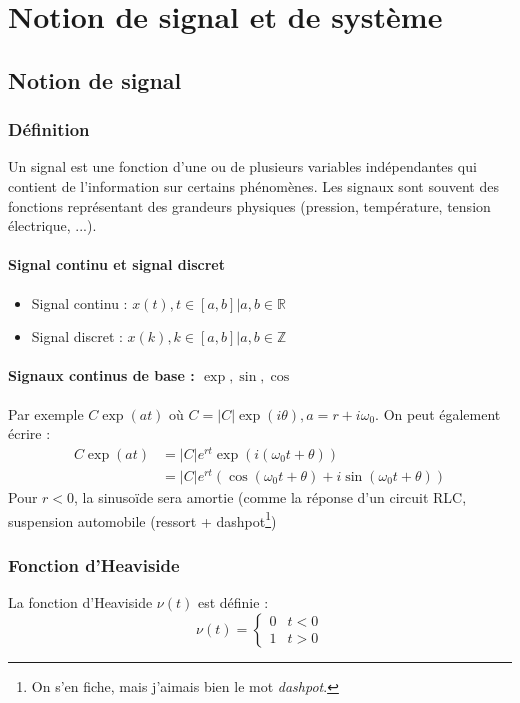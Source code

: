 \chapter{Notion de signal et de système}
\section{Notion de signal}
\subsection{Définition}
Un signal est une fonction d’une ou de plusieurs variables indépendantes 
qui contient de l’information sur certains phénomènes. Les signaux sont 
souvent des fonctions représentant des grandeurs physiques (pression, 
température, tension électrique, ...).
	
\subsubsection{Signal continu et signal discret}
\begin{itemize}
	\item Signal continu : $x(t), t \in [a,b] | a,b\in\mathbb{R}$
	\item Signal discret : $x(k), k \in [a,b] | a,b\in\mathbb{Z}$
\end{itemize}
	
\subsubsection{Signaux continus de base : $\exp,\sin,\cos$}
Par exemple $C\exp(at)$ où $C = |C|\exp(i\theta), a = r+i\omega_0$. 
On peut également écrire :
\begin{equation}
	\begin{array}{ll}
		C\exp(at) & = |C|e^{rt}\exp(i(\omega_0t+\theta))                          \\
		          & = |C|e^{rt}(\cos(\omega_0t+\theta) + i\sin(\omega_0t+\theta)) 
	\end{array}
\end{equation}
Pour $r<0$, la sinusoïde sera amortie (comme la réponse d'un circuit
RLC, suspension automobile (ressort + dashpot\footnote{On s'en fiche, 
	mais j'aimais bien le mot \textit{dashpot}.})
		
\subsection{Fonction d'Heaviside}
La fonction d'Heaviside $\nu(t)$ est définie :
\begin{equation}
	\nu(t) = \left\{\begin{array}{ll}
	0 & t<0\\
	1 & t>0	
	\end{array}\right.
	\label{eq:Heaviside}
\end{equation}
	
